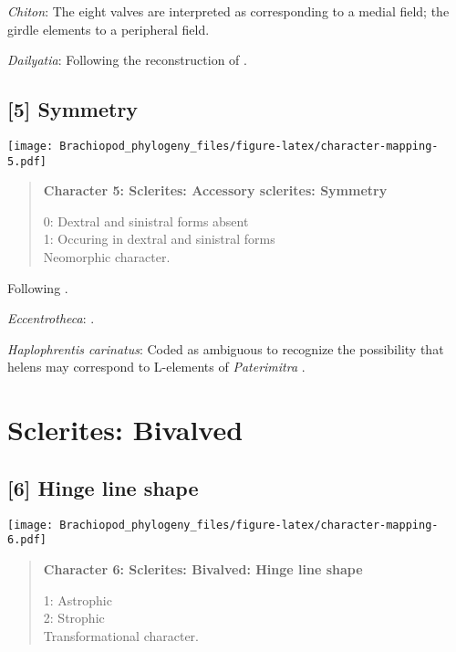 \documentclass[openany]{book}
\theoremstyle{definition}
\theoremstyle{definition}
\theoremstyle{definition}
\theoremstyle{remark}
\begin{document}
\hypertarget{Chiton-coding-4}{}
\emph{Chiton}: The eight valves are interpreted as corresponding to a
medial field; the girdle elements to a peripheral field.

\hypertarget{Dailyatia-coding-4}{}
\emph{Dailyatia}: Following the reconstruction of
\citet{Skovsted2015Theearly}.

\subsection*{{[}5{]} Symmetry}\label{symmetry}

\texttt{[image: Brachiopod\_phylogeny\_files/figure-latex/character-mapping-5.pdf]}

\begin{quote}
\textbf{Character 5: Sclerites: Accessory sclerites: Symmetry}

0: Dextral and sinistral forms absent\\
1: Occuring in dextral and sinistral forms\\
Neomorphic character.
\end{quote}

Following \citet{Zhao2017}.

\hypertarget{Eccentrotheca-coding-5}{}
\emph{Eccentrotheca}: \citet{Skovsted2008Thescleritome}.

\hypertarget{Haplophrentis_carinatus-coding-5}{}
\emph{Haplophrentis carinatus}: Coded as ambiguous to recognize the
possibility that helens may correspond to L-elements of
\emph{Paterimitra} \citep{Moysiuk2017Hyolithsare}.

\section{Sclerites: Bivalved}\label{sclerites-bivalved}

\subsection*{{[}6{]} Hinge line shape}\label{hinge-line-shape}

\texttt{[image: Brachiopod\_phylogeny\_files/figure-latex/character-mapping-6.pdf]}

\begin{quote}
\textbf{Character 6: Sclerites: Bivalved: Hinge line shape}

1: Astrophic\\
2: Strophic\\
Transformational character.
\end{quote}
\end{document}
